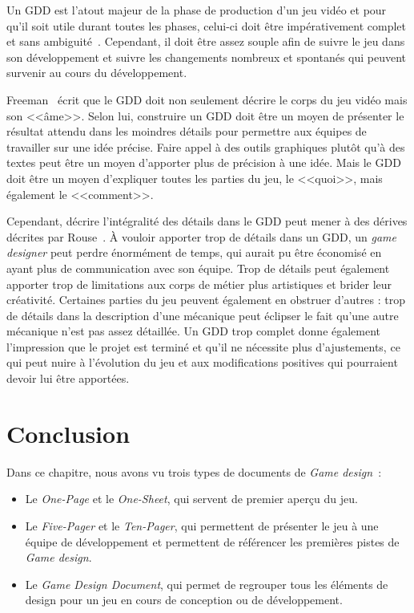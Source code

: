 Un GDD est l'atout majeur de la phase de production d'un jeu vidéo et pour qu'il soit utile durant toutes les phases, celui-ci doit être impérativement complet et sans ambiguité~\cite{GD_Guidelines}.
Cependant, il doit être assez souple afin de suivre le jeu dans son développement et suivre les changements nombreux et spontan\'es qui peuvent survenir au cours du développement.

Freeman~\cite{gama_greateGDD} écrit que le GDD doit non seulement décrire le corps du jeu vidéo mais son <<âme>>.
Selon lui, construire un GDD doit être un moyen de présenter le résultat attendu dans les moindres détails pour permettre aux équipes de travailler sur une idée précise.
Faire appel à des outils graphiques plutôt qu'à des textes peut être un moyen d'apporter plus de précision à une idée.
Mais le GDD doit être un moyen d'expliquer toutes les parties du jeu, le <<quoi>>, mais également le <<comment>>.

Cependant, décrire l'intégralité des détails dans le GDD peut mener à des dérives décrites par Rouse~\cite{GD_theory_rouse}.
À vouloir apporter trop de détails dans un GDD, un \emph{game designer} peut perdre énormément de temps, qui aurait pu être économisé en ayant plus de communication avec son équipe.
Trop de détails peut également apporter trop de limitations aux corps de métier plus artistiques et brider leur créativité.
Certaines parties du jeu peuvent également en obstruer d'autres : trop de détails dans la description d'une mécanique peut éclipser le fait qu'une autre mécanique n'est pas assez détaillée.
Un GDD trop complet donne également l'impression que le projet est terminé et qu'il ne nécessite plus d'ajustements, ce qui peut nuire à l'évolution du jeu et aux modifications positives qui pourraient devoir lui être apport\'ees.


\section{Conclusion}
Dans ce chapitre, nous avons vu trois types de documents de \emph{Game design}~: 
\begin{itemize}
    \item Le \emph{One-Page} et le \emph{One-Sheet}, qui servent de premier aperçu du jeu.
    \item Le \emph{Five-Pager} et le \emph{Ten-Pager}, qui permettent de présenter le jeu à une équipe de développement et permettent de référencer les premières pistes de \emph{Game design}.
    \item Le \emph{Game Design Document}, qui permet de regrouper tous les éléments de design pour un jeu en cours de conception ou de développement.
\end{itemize}



